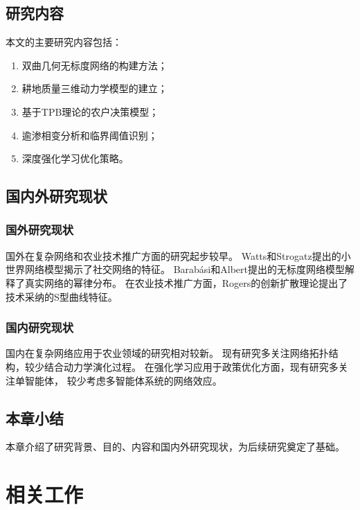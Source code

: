 \documentclass[12pt,a4paper]{article}
\numberwithin{equation}{section}
\begin{document}
\subsection{研究内容}

本文的主要研究内容包括：
\begin{enumerate}
    \item 双曲几何无标度网络的构建方法；
    \item 耕地质量三维动力学模型的建立；
    \item 基于TPB理论的农户决策模型；
    \item 逾渗相变分析和临界阈值识别；
    \item 深度强化学习优化策略。
\end{enumerate}

\subsection{国内外研究现状}

\subsubsection{国外研究现状}

国外在复杂网络和农业技术推广方面的研究起步较早。
Watts和Strogatz提出的小世界网络模型揭示了社交网络的特征。
Barabási和Albert提出的无标度网络模型解释了真实网络的幂律分布。
在农业技术推广方面，Rogers的创新扩散理论提出了技术采纳的S型曲线特征。

\subsubsection{国内研究现状}

国内在复杂网络应用于农业领域的研究相对较新。
现有研究多关注网络拓扑结构，较少结合动力学演化过程。
在强化学习应用于政策优化方面，现有研究多关注单智能体，
较少考虑多智能体系统的网络效应。

\subsection{本章小结}

本章介绍了研究背景、目的、内容和国内外研究现状，为后续研究奠定了基础。

\newpage

\section{相关工作}
\end{document}
